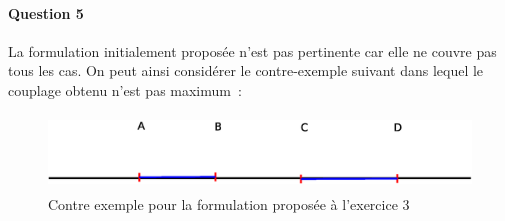 \paragraph{Question 5}
La formulation initialement proposée n'est pas pertinente car elle ne
couvre pas tous les cas. On peut ainsi considérer le contre-exemple
suivant dans lequel le couplage obtenu n'est pas maximum~: 
\begin{figure}[!ht]
\begin{center}
\includegraphics[height=2cm]{exo3.eps}
\end{center}
\caption{Contre exemple pour la formulation proposée à l'exercice 3}
\end{figure}

